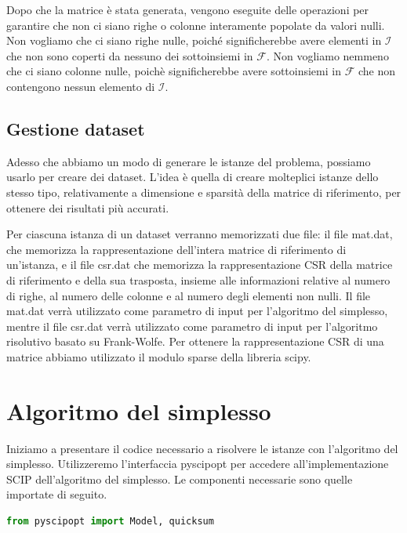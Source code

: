 Dopo che la matrice è stata generata, vengono
eseguite delle operazioni per garantire che non ci siano righe o colonne interamente popolate da valori nulli. Non
vogliamo che ci siano righe nulle, poiché significherebbe avere elementi in
\(
    \mathcal{I}
\)
che non sono coperti da nessuno dei sottoinsiemi in \( \mathcal{F} \). Non vogliamo nemmeno che ci siano colonne nulle,
poichè significherebbe avere sottoinsiemi in \( \mathcal{F} \) che non contengono nessun elemento di \( \mathcal{I} \).

\subsection{Gestione dataset}
Adesso che abbiamo un modo di generare le istanze del problema, possiamo usarlo per creare dei dataset. L'idea è quella
di creare molteplici istanze dello stesso tipo, relativamente a dimensione e sparsità della matrice di riferimento, per
ottenere dei risultati più accurati.

Per ciascuna istanza di un dataset verranno memorizzati due file:
il file {\jbm mat.dat}, che memorizza la
rappresentazione dell'intera matrice di riferimento di un'istanza, e il file {\jbm csr.dat} che memorizza la
rappresentazione CSR della matrice di riferimento e della sua trasposta, insieme alle informazioni relative al numero di
righe, al numero delle colonne e al numero degli elementi non nulli. Il file {\jbm mat.dat} verrà utilizzato come
parametro di input per l'algoritmo del simplesso, mentre il file {\jbm csr.dat} verrà utilizzato come parametro di input
per l'algoritmo risolutivo basato su Frank-Wolfe. Per ottenere la rappresentazione CSR di una matrice abbiamo utilizzato
il modulo sparse della libreria scipy.

\section{Algoritmo del simplesso}
Iniziamo a presentare il codice necessario a risolvere le istanze con l'algoritmo del simplesso. Utilizzeremo
l'interfaccia pyscipopt per accedere all'implementazione SCIP dell'algoritmo del simplesso. Le componenti necessarie
sono quelle importate di seguito.

\begin{inline}
\begin{lstlisting}[style = style2, language=python]
from pyscipopt import Model, quicksum
\end{lstlisting}
\end{inline}

